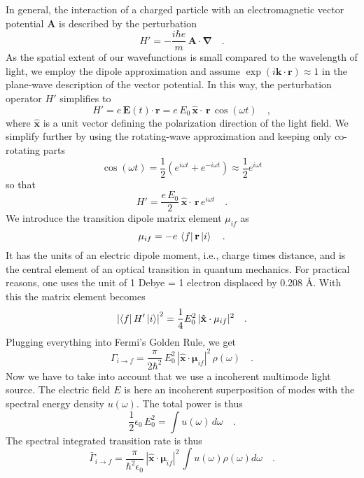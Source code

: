 In general, the interaction of a charged particle with an electromagnetic vector potential $\mathbf{A}$ is described by the perturbation
\[
 H' = - \frac{i \hbar e}{m} \, \mathbf{A \cdot \nabla}  \quad .
\]
As the spatial extent of our wavefunctions is small compared to the wavelength of light, we employ the dipole approximation and assume $\exp( i \mathbf{k \cdot r}) \approx 1$ in the plane-wave description of the vector potential. In this way, the  perturbation operator $H'$ simplifies to
\[
 H' =  e \, \mathbf{E} (t)  \mathbf{\cdot \, r} =  e \,E_0 \,  \mathbf{\hat{x} \cdot \, r} \, \cos(\omega t) \quad ,
\]
where $\mathbf{\hat{x}} $ is a unit vector defining the polarization direction of the light field. We simplify further by using the rotating-wave approximation and keeping only co-rotating parts 
\[
 \cos(\omega t)
 = \frac{1}{2} \left( e^{i \omega t}+  e^{-i \omega t} \right)
 \approx  \frac{1}{2}  e^{i \omega t} 
\]
so that 
\[
H' =  \frac{ e \,E_0}{2}  \,  \mathbf{\hat{x} \cdot \, r} \,  e^{i \omega t}  \quad .
\]
%
 We introduce the transition dipole matrix element $\mu_{if}$ as
\[
\mathbf{\mu}_{if} = -e \, \bra{f}    \mathbf{r} \ket{i}  \quad .
\]
It has the units of an electric dipole moment, i.e., charge times distance, and is the central element of an optical transition in quantum mechanics. For practical reasons, one uses the unit of 1 Debye = 1 electron displaced by 0.208 \AA.
With this the matrix element  becomes
\[
\left| \bra{f} H' \ket{i} \right|^2 =  \frac{1}{4} E_0^2  \, |\mathbf{\hat{x}} \cdot \mathbf{\mu}_{if} |^2 \quad .
\]
Plugging everything into Fermi's Golden Rule, we get
\[
 \Gamma_{i \rightarrow f} = \frac{\pi}{2 \hbar^2} \,  E_0^2  \, |\mathbf{\hat{x}} \cdot \mathbf{\mu}_{if} |^2 \, \rho(\omega) \quad .
\]
Now we have to take into account that we use a incoherent multimode light source. The electric field $E$ is here an incoherent superposition of  modes with the  spectral energy density $u(\omega)$.
The total power is thus
\[
 \frac{1}{2} \epsilon_0  \, E_0^2  = \int  u(\omega)  \, d\omega \quad .
\]
The spectral integrated transition rate is thus 
\[
 \bar{\Gamma}_{i \rightarrow f} =   \frac{\pi  }{\hbar^2 \epsilon_0}  \, |\mathbf{\hat{x}} \cdot \mathbf{\mu}_{if} |^2 \,
\int u(\omega)  
  \rho(\omega)  d \omega \quad .
\]
